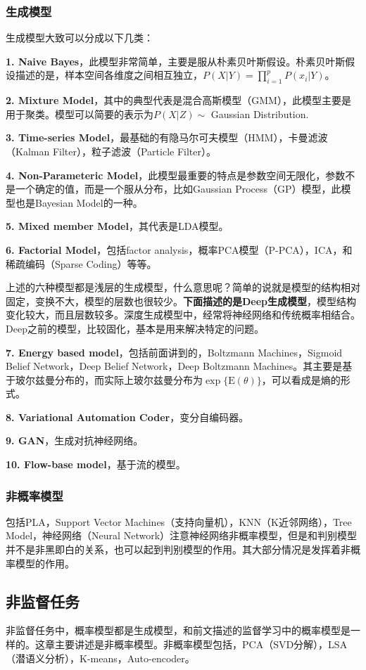 \documentclass[a4paper]{article}
\begin{document}
\subsubsection{生成模型}
生成模型大致可以分成以下几类：

\textbf{1. Naive Bayes}，此模型非常简单，主要是服从朴素贝叶斯假设。朴素贝叶斯假设描述的是，样本空间各维度之间相互独立，$P(X|Y)=\prod_{i=1}^p P(x_i|Y)$。

\textbf{2. Mixture Model}，其中的典型代表是混合高斯模型（GMM），此模型主要是用于聚类。模型可以简要的表示为$P(X|Z)\sim$ Gaussian Distribution.

\textbf{3. Time-series Model}，最基础的有隐马尔可夫模型（HMM），卡曼滤波（Kalman Filter），粒子滤波（Particle Filter）。

\textbf{4. Non-Parameteric Model}，此模型最重要的特点是参数空间无限化，参数不是一个确定的值，而是一个服从分布，比如Gaussian Process（GP）模型，此模型也是Bayesian Model的一种。

\textbf{5. Mixed member Model}，其代表是LDA模型。

\textbf{6. Factorial Model}，包括factor analysis，概率PCA模型（P-PCA），ICA，和稀疏编码（Sparse Coding）等等。

上述的六种模型都是浅层的生成模型，什么意思呢？简单的说就是模型的结构相对固定，变换不大，模型的层数也很较少。\textbf{下面描述的是Deep生成模型}，模型结构变化较大，而且层数较多。深度生成模型中，经常将神经网络和传统概率相结合。Deep之前的模型，比较固化，基本是用来解决特定的问题。

\textbf{7. Energy based model}，包括前面讲到的，Boltzmann Machines，Sigmoid Belief Network，Deep Belief Network，Deep Boltzmann Machines。其主要是基于玻尔兹曼分布的，而实际上玻尔兹曼分布为$\exp\{\mathrm{E}(\theta)\}$，可以看成是熵的形式。

\textbf{8. Variational Automation Coder}，变分自编码器。

\textbf{9. GAN}，生成对抗神经网络。

\textbf{10. Flow-base model}，基于流的模型。

\subsubsection{非概率模型}
包括PLA，Support Vector Machines（支持向量机），KNN（K近邻网络），Tree Model，神经网络（Neural Network）注意神经网络非概率模型，但是和判别模型并不是非黑即白的关系，也可以起到判别模型的作用。其大部分情况是发挥着非概率模型的作用。

\subsection{非监督任务}
非监督任务中，概率模型都是生成模型，和前文描述的监督学习中的概率模型是一样的。这章主要讲述是非概率模型。非概率模型包括，PCA（SVD分解），LSA（潜语义分析），K-means，Auto-encoder。
\end{document}
